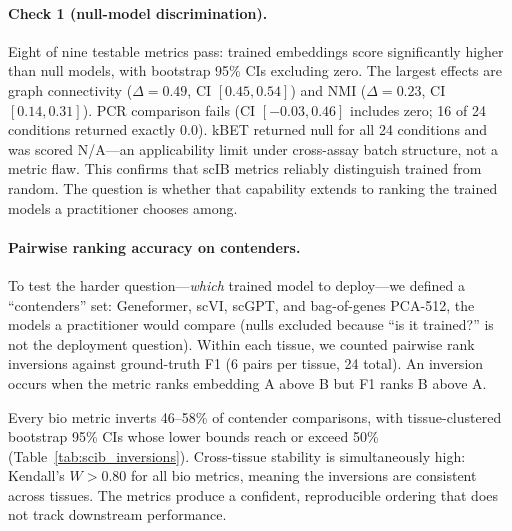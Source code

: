 \documentclass[9pt,lineno]{elife}
\begin{document}
\paragraph{Check 1 (null-model discrimination).} Eight of nine testable metrics pass: trained embeddings score significantly higher than null models, with bootstrap 95\% CIs excluding zero. The largest effects are graph connectivity ($\Delta = 0.49$, CI $[0.45, 0.54]$) and NMI ($\Delta = 0.23$, CI $[0.14, 0.31]$). PCR comparison fails (CI $[-0.03, 0.46]$ includes zero; 16 of 24 conditions returned exactly 0.0). kBET returned null for all 24 conditions and was scored N/A---an applicability limit under cross-assay batch structure, not a metric flaw. This confirms that scIB metrics reliably distinguish trained from random. The question is whether that capability extends to ranking the trained models a practitioner chooses among.

\paragraph{Pairwise ranking accuracy on contenders.} To test the harder question---\emph{which} trained model to deploy---we defined a ``contenders'' set: Geneformer, scVI, scGPT, and bag-of-genes PCA-512, the models a practitioner would compare (nulls excluded because ``is it trained?'' is not the deployment question). Within each tissue, we counted pairwise rank inversions against ground-truth F1 (6 pairs per tissue, 24 total). An inversion occurs when the metric ranks embedding A above B but F1 ranks B above A.

Every bio metric inverts 46--58\% of contender comparisons, with tissue-clustered bootstrap 95\% CIs whose lower bounds reach or exceed 50\% (Table~\ref{tab:scib_inversions}). Cross-tissue stability is simultaneously high: Kendall's $W > 0.80$ for all bio metrics, meaning the inversions are consistent across tissues. The metrics produce a confident, reproducible ordering that does not track downstream performance.
\end{document}
